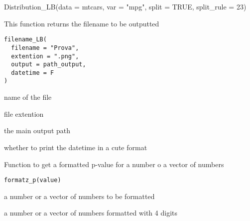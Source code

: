 \documentclass[a4paper]{book}
\begin{document}
%
\begin{Examples}
\begin{ExampleCode}
Distribution_LB(data = mtcars, var = "mpg", split = TRUE, split_rule = 23)
\end{ExampleCode}
\end{Examples}
%
\begin{Description}
This function returns the filename to be outputted
\end{Description}
%
\begin{Usage}
\begin{verbatim}
filename_LB(
  filename = "Prova",
  extention = ".png",
  output = path_output,
  datetime = F
)
\end{verbatim}
\end{Usage}
%
\begin{Arguments}
\begin{ldescription}
\item[\code{filename}] name of the file

\item[\code{extention}] file extention

\item[\code{output}] the main output path

\item[\code{datetime}] whether to print the datetime in a cute format
\end{ldescription}
\end{Arguments}
%
\begin{Description}
Function to get a formatted p-value for a number o a vector of numbers
\end{Description}
%
\begin{Usage}
\begin{verbatim}
formatz_p(value)
\end{verbatim}
\end{Usage}
%
\begin{Arguments}
\begin{ldescription}
\item[\code{value}] a number or a vector of numbers to be formatted
\end{ldescription}
\end{Arguments}
%
\begin{Value}
a number or a vector of numbers formatted with 4 digits
\end{Value}
\end{document}
